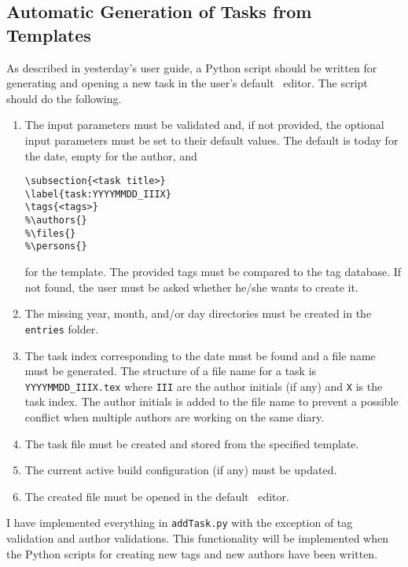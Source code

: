\subsection{Automatic Generation of Tasks from Templates}
\label{task:20140316_jkn0}
As described in yesterday's user guide, a Python script should be written for generating and opening a new task in the user's default \LaTeXe\ editor. The script should do the following.
\begin{enumerate}
  \item The input parameters must be validated and, if not provided, the optional input parameters must be set to their default values. The default is today for the date, empty for the author, and
\begin{lstlisting}[language={[LaTeX]TeX}]
% mainfile: ../../../../master.tex
\subsection{<task title>}
\label{task:YYYYMMDD_IIIX}
\tags{<tags>}
%\authors{}
%\files{}
%\persons{}
\end{lstlisting}
for the template. The provided tags must be compared to the tag database. If not found, the user must be asked whether he/she wants to create it.
  \item The missing year, month, and/or day directories must be created in the {\tt entries} folder.
  \item The task index corresponding to the date must be found and a file name must be generated. The structure of a file name for a task is {\tt YYYYMMDD\_IIIX.tex} where {\tt III} are the author initials (if any) and {\tt X} is the task index. The author initials is added to the file name to prevent a possible conflict when multiple authors are working on the same diary.
  \item The task file must be created and stored from the specified template.
  \item The current active build configuration (if any) must be updated.
  \item The created file must be opened in the default \LaTeXe\ editor.
\end{enumerate}
I have implemented everything in {\tt addTask.py} with the exception of tag validation and author validations. This functionality will be implemented when the Python scripts for creating new tags and new authors have been written. 
